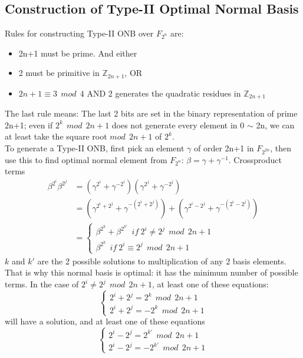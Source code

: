 	\subsection{Construction of Type-II Optimal Normal Basis}
Rules for constructing Type-II ONB over $F_{2^n}$ are:
\begin{itemize}
\item 2n+1 must be prime. And either
\item 2 must be primitive in $\mathbb{Z}_{2n+1}$, OR
\item $2n+1 \equiv 3 \ \ mod\ \  4$ AND 2 generates the quadratic residues in $\mathbb{Z}_{2n+1}$
\end{itemize}
The last rule means: The last 2 bits are set in the binary representation of prime 2n+1; even if $2^k \ \ mod\ \  2n+1$ does not
generate every element in 0 $\sim$ 2n, we can at least take the square root $mod\ \  2n+1$ of $2^k$. \\
To generate a Type-II ONB, first pick an element $\gamma$ of order 2n+1 in $F_{2^{2n}}$, then use this to find optimal normal 
element from $F_{2^n}$: $\beta = \gamma + \gamma^{-1}$. Crossproduct terms
\begin{equation}
\begin{split}
\beta^{2^i}\beta^{2^j} &= (\gamma^{2^i} + \gamma^{-2^i})(\gamma^{2^j} + \gamma^{-2^j})\\ &= 
(\gamma^{2^i+2^j} + \gamma^{-(2^i+2^j)}) + (\gamma^{2^i-2^j} + \gamma^{-(2^i-2^j)})\\ &= 
\begin{cases}
\beta^{2^k} + \beta^{2^{k\prime}}\ \  if\ 2^i \neq 2^j \ \ mod\ \  2n+1\\
\beta^{2^k}\ \  if\ 2^i \equiv 2^j \ \ mod\ \  2n+1
\end{cases}
\end{split}
\end{equation}
$k$ and $k\prime$ are the 2 possible solutions to multiplication of any 2 basis elements. That is why this normal basis
 is optimal: it has the minimum number of possible terms. In the case of $2^i \neq 2^j \ \ mod\ \  2n+1$, at least one of these
equations:
\begin{equation}
\begin{cases}
2^i + 2^j = 2^k \ \ mod\ \  2n+1\\
2^i + 2^j = -2^k \ \ mod \ \ 2n+1
\end{cases}
\end{equation}
will have a solution, and at least one of these equations
\begin{equation}
\begin{cases}
2^i - 2^j = 2^{k\prime} \ \ mod \ \ 2n+1\\
2^i - 2^j = -2^{k\prime} \ \ mod \ \ 2n+1
\end{cases}
\end{equation}
